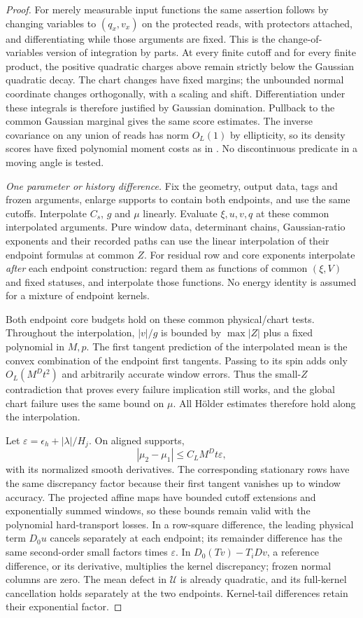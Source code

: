 \begin{proof}
For merely measurable input functions the same assertion follows by
changing variables to $(q_x,v_x)$ on the protected reads, with
protectors attached, and differentiating while those arguments are
fixed.  This is the change-of-variables version of integration by
parts.  At every finite cutoff and for every finite product, the
positive quadratic charges above remain strictly below the Gaussian
quadratic decay.  The chart changes have fixed margins; the unbounded
normal coordinate changes orthogonally, with a scaling and shift.
Differentiation under these integrals is therefore justified by
Gaussian domination.  Pullback to the common Gaussian marginal gives
the same score estimates.  The inverse covariance on any union of
reads has norm $O_L(1)$ by ellipticity, so its density scores have
fixed polynomial moment costs as in .
No discontinuous predicate in a moving angle is tested.

\emph{One parameter or history difference.}
Fix the geometry, output data, tags and frozen arguments, enlarge
supports to contain both endpoints, and use the same cutoffs.
Interpolate $C_s$, $g$ and $\mu$ linearly.  Evaluate $\xi,u,v,q$ at
these common interpolated arguments.  Pure window data, determinant
chains, Gaussian-ratio exponents and their recorded paths can use the
linear interpolation of their endpoint formulas at common $Z$.
For residual row and core exponents interpolate \emph{after} each
endpoint construction: regard them as functions of common
$(\xi,V)$ and fixed statuses, and interpolate those functions.
No energy identity is assumed for a mixture of endpoint kernels.

Both endpoint core budgets hold on these common physical/chart tests.
Throughout the interpolation, $|v|/g$ is bounded by $\max|Z|$ plus a
fixed polynomial in $M,p$.  The first tangent prediction of the
interpolated mean is the convex combination of the endpoint first
tangents.  Passing to its spin adds only
$O_L(M^Dt^2)$ and arbitrarily accurate window errors.  Thus the
small-$Z$ contradiction that proves every failure implication still
works, and the global chart failure uses the same bound on $\mu$.
All H\"older estimates therefore hold along the interpolation.

Let $\varepsilon=\epsilon_h+|\lambda|/H_j$.  On aligned supports,
\[
 |\mu_2-\mu_1|\le C_LM^Dt\varepsilon,
\]
with its normalized smooth derivatives.  The corresponding stationary
rows have the same discrepancy factor because their first tangent
vanishes up to window accuracy.  The projected affine maps have
bounded cutoff extensions and exponentially summed windows, so these
bounds remain valid with the polynomial hard-transport losses.  In a
row-square difference, the leading physical term $D_0u$ cancels
separately at each endpoint; its remainder difference has the same
second-order small factors times $\varepsilon$.  In
$D_0(Tv)-T_iDv$, a reference difference, or its derivative, multiplies
the kernel discrepancy; frozen normal columns are zero.  The mean
defect in $\mathcal U$ is already quadratic, and its full-kernel
cancellation holds separately at the two endpoints.  Kernel-tail
differences retain their exponential factor.


\end{proof}

